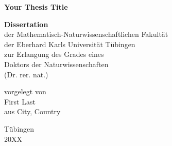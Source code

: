 \begin{titlepage}
    \begin{center}
        \vspace*{1cm}
        
        \Huge\textbf{Your Thesis Title}
        
        \vspace{5.5cm}
        
        \large\textbf{Dissertation}\\
        der Mathematisch-Naturwissenschaftlichen Fakultät\\
        der Eberhard Karls Universität Tübingen\\
        zur Erlangung des Grades eines\\
        Doktors der Naturwissenschaften\\
        (Dr. rer. nat.)
        
        \vspace{6.0cm}
        
        vorgelegt von\\
        First Last\\
        aus City, Country\\
        
        \vspace{2.2cm}
        
        Tübingen\\
        20XX
        
    \end{center}
\end{titlepage}